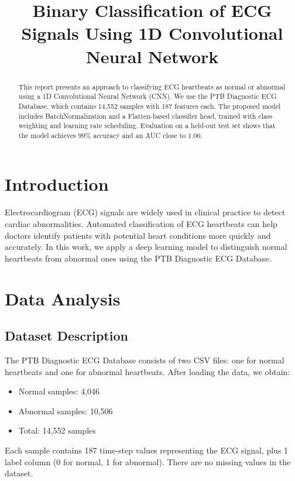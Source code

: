 \documentclass[conference]{IEEEtran}
\title{Binary Classification of ECG Signals Using 1D Convolutional Neural Network}
\author{
	\IEEEauthorblockN{Nguyen Tuan Thanh}
	\IEEEauthorblockA{
		Student ID: 22BA13289 \\
		University of Science and Technology of Ha Noi (USTH) \\
		Email: thanhnt.22ba13289@usth.edu.vn
	}
}
\begin{document}
\maketitle

\begin{abstract}
This report presents an approach to classifying ECG heartbeats as normal or abnormal using a 1D Convolutional Neural Network (CNN). We use the PTB Diagnostic ECG Database, which contains 14,552 samples with 187 features each. The proposed model includes BatchNormalization and a Flatten-based classifier head, trained with class weighting and learning rate scheduling. Evaluation on a held-out test set shows that the model achieves 99\% accuracy and an AUC close to 1.00.
\end{abstract}


\section{Introduction}

Electrocardiogram (ECG) signals are widely used in clinical practice to detect cardiac abnormalities. Automated classification of ECG heartbeats can help doctors identify patients with potential heart conditions more quickly and accurately. In this work, we apply a deep learning model to distinguish normal heartbeats from abnormal ones using the PTB Diagnostic ECG Database.


\section{Data Analysis}

\subsection{Dataset Description}

The PTB Diagnostic ECG Database consists of two CSV files: one for normal heartbeats and one for abnormal heartbeats. After loading the data, we obtain:

\begin{itemize}
	\item Normal samples: 4,046
	\item Abnormal samples: 10,506
	\item Total: 14,552 samples
\end{itemize}

Each sample contains 187 time-step values representing the ECG signal, plus 1 label column (0 for normal, 1 for abnormal). There are no missing values in the dataset.
\end{document}
